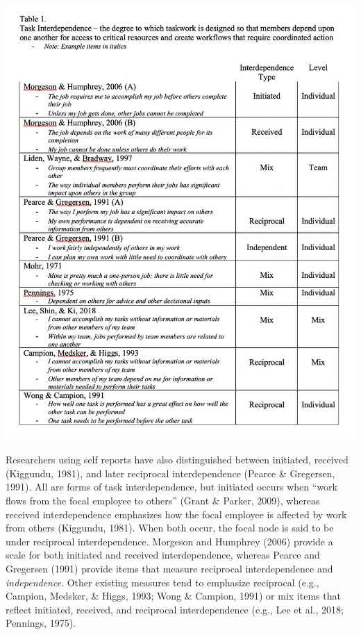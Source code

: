 \documentclass[english,,man]{apa6}
\theoremstyle{definition}
\theoremstyle{definition}
\theoremstyle{definition}
\theoremstyle{remark}
\begin{document}
\includegraphics{images/table1.png}

Researchers using self reports have also distinguished between
initiated, received (Kiggundu, 1981), and later reciprocal
interdependence (Pearce \& Gregersen, 1991). All are forms of task
interdependence, but initiated occurs when \enquote{work flows from the
focal employee to others} (Grant \& Parker, 2009), whereas received
interdependence emphasizes how the focal employee is affected by work
from others (Kiggundu, 1981). When both occur, the focal node is said to
be under reciprocal interdependence. Morgeson and Humphrey (2006)
provide a scale for both initiated and received interdependence, whereas
Pearce and Gregersen (1991) provide items that measure reciprocal
interdependence and \emph{independence}. Other existing measures tend to
emphasize reciprocal (e.g., Campion, Medsker, \& Higgs, 1993; Wong \&
Campion, 1991) or mix items that reflect initiated, received, and
reciprocal interdependence (e.g., Lee et al., 2018; Pennings, 1975).
\end{document}
